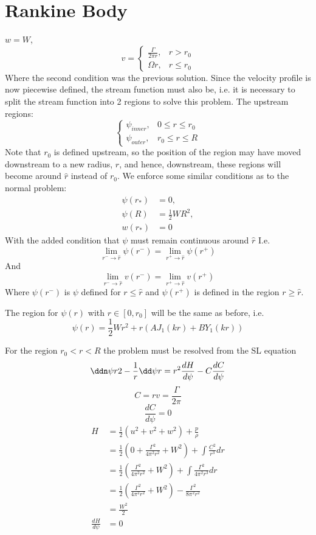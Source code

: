 \documentclass{X:/Documents/Coding/Latex/myreport}
\begin{document}
\section{Rankine Body}
$w = W$, 
\[v = \begin{cases}
    \frac{\Gamma}{{2 \pi r}}, &r > r_0 \\
\Omega r ,& r \leq r_0
\end{cases}  \]
Where the second condition was the previous solution. Since the velocity profile is now piecewise defined, the stream function must also be, i.e. it is necessary to split the stream function into 2 regions to solve this problem. The upstream regions:
 \[\begin{cases}
         \psi_{inner}, & 0\leq r\leq r_0 \\
         \psi_{outer}, & r_0\leq r\leq R
     \end{cases}
 \]
Note that $r_0$ is defined upstream, so the position of the region may have moved downstream to a new radius, $\hat{r}$, and hence, downstream, these regions will become around $\hat{r}$ instead of $r_0$. We enforce some similar conditions as to the normal problem:
\begin{align*}
    \psi(r_*) &= 0, \\
    \psi(R) &= \frac12 WR^2,\\
    w(r_*) &= 0
\end{align*}
With the added condition that $\psi$ must remain continuous around $\hat{r}$
I.e.
\[\lim_{r^-\to \hat{r}} \psi(r^-) = \lim_{r^+ \to \hat{r}} \psi(r^+)\]
And
\[\lim_{r^- \to \hat{r}} v(r^-) = \lim_{r^+ \to \hat{r}} v(r^+)\]
Where $\psi(r^-)$ is $\psi$ defined for $r \leq \hat{r}$ and $\psi(r^+)$ is defined in the region $r \geq \hat{r}$.

The region for $\psi(r)$ with $r\in [0,r_0]$ will be the same as before, i.e.
\[\psi(r) = \frac12 Wr^2 + r(AJ_1(kr) + BY_1(kr))\]

For the region $r_0<r<R$ the problem must be resolved from the SL equation
\[\ddn \psi r 2 - \frac1r \dd\psi r = r^2 \frac{dH}{d\psi} - C \frac{dC}{d\psi}\]
\[C = rv = \frac{\Gamma}{2\pi}\]
\[\frac{dC}{d\psi} = 0\]
\begin{align*}
    H &= \frac12 (u^2 + v^2 + w^2) + \frac{p}{\rho}\\
    &= \frac12 (0 + \frac{\Gamma^2}{4\pi^2 r^2} + W^2) + \int \frac{C^2}{r^3} dr\\
    &=   \frac12 (\frac{\Gamma^2}{4\pi^2 r^2} + W^2) + \int \frac{\Gamma^2}{4 \pi^2r^3} dr\\
    &=   \frac12 (\frac{\Gamma^2}{4\pi^2 r^2} + W^2) -\frac{\Gamma^2}{8 \pi^2r^2} \\
    &= \frac{W^2}{2}\\
    \frac{dH}{d\psi} &= 0
\end{align*}
\end{document}
